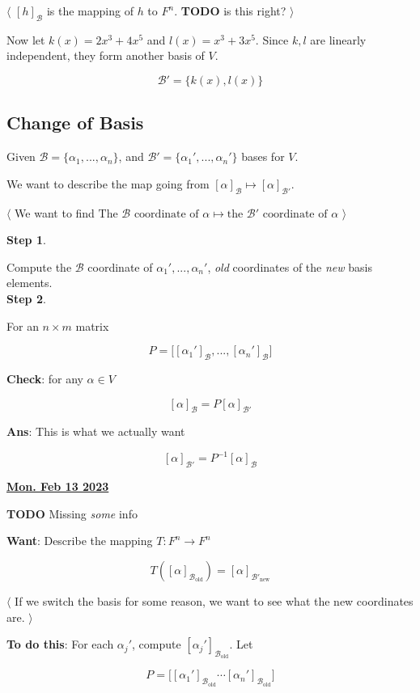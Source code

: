 \documentclass[12pt]{article}
\def\B{\mathcal B}
\newcommand{\btw}[1]{
    $\langle$ #1 $\rangle$
}
\renewcommand{\date}[1]{\underline{\bf #1}}
\newcommand{\TODO}{\color{red}\textbf{TODO}\color{black}}
\begin{document}
    \btw {
      $[h]_{\B}$ is the mapping of $h$ to $F^n$. \TODO{} is this right?
    }

    Now let $k(x) = 2x^3 + 4x^5$ and $l(x) = x^3 + 3x^5$. Since $k, l$ are
    linearly independent, they form another basis of $V$.

    \[
      \B' = \{k(x), l(x)\}
    \]

    \subsection{Change of Basis}

    Given $\B = \{\alpha_1, ..., \alpha_n\}$, and $\B' = \{\alpha_1', ...,
    \alpha_n'\}$ bases for $V$.

    We want to describe the map going from $[\alpha]_{\B} \mapsto
    [\alpha]_{\B'}$.

    \btw{ We want to find $\text{The $\B$ coordinate of $\alpha$} \mapsto
    \text{the $\B'$ coordinate of $\alpha$}$}

    {\bf Step 1}.

    Compute the $\B$ coordinate of $\alpha_1', ..., \alpha_n'$, {\it old}
    coordinates of the {\it new} basis elements. \\

    {\bf Step 2}.

    For an $n \times m$ matrix

    \[
      P = \Big[ [\alpha_1']_{\B}, ..., [\alpha_n']_{\B} \Big]
    \]

    {\bf Check}: for any $\alpha \in V$

    \[
      [\alpha]_{\B} = P [\alpha]_{\B'}
    \]

    {\bf Ans}: This is what we actually want

    \[
      [\alpha]_{\B'} = P^{-1} [\alpha]_{\B}
    \]

    \date{Mon. Feb 13 2023}

    \TODO{} Missing {\it some} info

    {\bf Want}: Describe the mapping $T: F^n \to F^n$

    \[
      T([\alpha]_{\B_\text{old}}) = [\alpha]_{\B'_{\text{new}}}
    \]

    \btw {
      If we switch the basis for some reason, we want to see what the new
      coordinates are.
    }

    {\bf To do this}: For each $\alpha_j'$, compute
    $[\alpha_j']_{\B_\text{old}}$. Let

    \[
      P = \Big[[\alpha_1']_{\B_\text{old}} \cdots [\alpha_n']_{\B_{\text{old}}}\Big]
    \]
\end{document}
